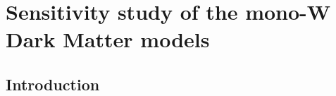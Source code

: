 


% 
% 

\chapter{Sensitivity study of the mono-W Dark Matter models}
\label{app:monoW}




\section{Introduction}


